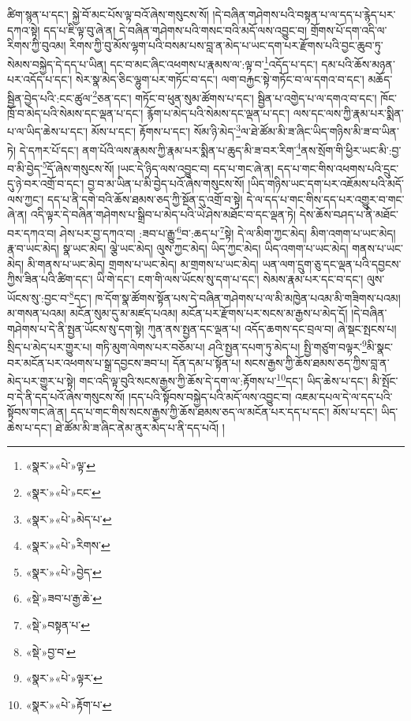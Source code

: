 ཚིག་སྙན་པ་དང་། སྐྱེ་བོ་མང་པོས་ལྟ་བའོ་ཞེས་གསུངས་སོ། །དེ་བཞིན་གཤེགས་པའི་བསྟན་པ་ལ་དད་པ་རྙེད་པར་དཀའ་སྟེ། དད་པ་ཇི་ལྟ་བུ་ཞེ་ན། དེ་བཞིན་གཤེགས་པའི་གསང་བའི་མདོ་ལས་འབྱུང་བ། གྲོགས་པོ་དག་འདི་ལ་རིགས་ཀྱི་བུའམ། རིགས་ཀྱི་བུ་མོས་ལྷག་པའི་བསམ་པས་བླ་ན་མེད་པ་ཡང་དག་པར་རྫོགས་པའི་བྱང་ཆུབ་ཏུ་སེམས་བསྐྱེད་དེ་དད་པ་ཡིན། དང་བ་མང་ཞིང་འཕགས་པ་རྣམས་ལ་:ལྟ་བ་\footnote{«སྣར་»«པེ་»ལྟ་}འདོད་པ་དང་། དམ་པའི་ཆོས་མཉན་པར་འདོད་པ་དང་། སེར་སྣ་མེད་ཅིང་ལྷུག་པར་གཏོང་བ་དང་། ལག་བརྐྱང་སྟེ་གཏོང་བ་ལ་དགའ་བ་དང་། མཆོད་སྦྱིན་བྱེད་པའི་:ངང་ཚུལ་\footnote{«སྣར་»«པེ་»ངང་}ཅན་དང་། གཏོང་བ་ཕུན་སུམ་ཚོགས་པ་དང་། སྦྱིན་པ་འགྱེད་པ་ལ་དགའ་བ་དང་། ཁོང་ཁྲོ་བ་མེད་པའི་སེམས་དང་ལྡན་པ་དང་། རྙོག་པ་མེད་པའི་སེམས་དང་ལྡན་པ་དང་། ལས་དང་ལས་ཀྱི་རྣམ་པར་སྨིན་པ་ལ་ཡིད་ཆེས་པ་དང་། མོས་པ་དང་། རྟོགས་པ་དང་། སོམ་ཉི་མེད་\footnote{«སྣར་»«པེ་»མེད་པ་}ལ་ཐེ་ཚོམ་མི་ཟ་ཞིང་ཡིད་གཉིས་མི་ཟ་བ་ཡིན་ཏེ། དེ་དཀར་པོ་དང་། ནག་པོའི་ལས་རྣམས་ཀྱི་རྣམ་པར་སྨིན་པ་ཆུད་མི་ཟ་བར་རིག་\footnote{«སྣར་»«པེ་»རིགས་}ནས་སྲོག་གི་ཕྱིར་ཡང་མི་:བྱ་བ་མི་བྱེད་\footnote{«སྣར་»«པེ་»བྱེད་}དོ་ཞེས་གསུངས་སོ། །ཡང་དེ་ཉིད་ལས་འབྱུང་བ། དད་པ་གང་ཞེ་ན། དད་པ་གང་གིས་འཕགས་པའི་དྲུང་དུ་ཉེ་བར་འགྲོ་བ་དང་། བྱ་བ་མ་ཡིན་པ་མི་བྱེད་པའོ་ཞེས་གསུངས་སོ། །ཡིད་གཉིས་ཡང་དག་པར་འཇོམས་པའི་མདོ་ལས་ཀྱང་། དད་པ་ནི་དགེ་བའི་ཆོས་ཐམས་ཅད་ཀྱི་སྔོན་དུ་འགྲོ་བ་སྟེ། དེ་ལ་དད་པ་གང་གིས་དད་པར་འགྱུར་བ་གང་ཞེ་ན། འདི་ལྟར་དེ་བཞིན་གཤེགས་པ་སྒྲིབ་པ་མེད་པའི་ཡེ་ཤེས་མཐོང་བ་དང་ལྡན་ཏེ། དེས་ཆོས་བཤད་པ་ནི་མཐོང་བར་དཀའ་བ། ཤེས་པར་བྱ་དཀའ་བ། :ཟབ་པ་རྒྱུ་\footnote{«སྡེ་»ཟབ་པ་རྒྱ་ཆེ་}བ་:ཆད་པ་\footnote{«སྡེ་»བསྟན་པ་}སྟེ། དེ་ལ་མིག་ཀྱང་མེད། མིག་འགག་པ་ཡང་མེད། རྣ་བ་ཡང་མེད། སྣ་ཡང་མེད། ལྕེ་ཡང་མེད། ལུས་ཀྱང་མེད། ཡིད་ཀྱང་མེད། ཡིད་འགག་པ་ཡང་མེད། གནས་པ་ཡང་མེད། མི་གནས་པ་ཡང་མེད། གྲགས་པ་ཡང་མེད། མ་གྲགས་པ་ཡང་མེད། ཡན་ལག་དྲུག་ཅུ་དང་ལྡན་པའི་དབྱངས་ཀྱིས་ཟིན་པའི་ཚིག་དང་། ཡི་གེ་དང་། ངག་གི་ལས་ཡོངས་སུ་དག་པ་དང་། སེམས་རྣམ་པར་དང་བ་དང་། ལུས་ཡོངས་སུ་:བྱང་བ་\footnote{«སྡེ་»བྱ་བ་}དང་། ཁ་དོག་སྣ་ཚོགས་སྟོན་པས་དེ་བཞིན་གཤེགས་པ་ལ་མི་མཁྱེན་པའམ་མི་གཟིགས་པའམ། མ་གསན་པའམ། མངོན་སུམ་དུ་མ་མཛད་པའམ། མངོན་པར་རྫོགས་པར་སངས་མ་རྒྱས་པ་མེད་དོ། །དེ་བཞིན་གཤེགས་པ་དེ་ནི་སྤྱན་ཡོངས་སུ་དག་སྟེ། ཀུན་ནས་སྤྱན་དང་ལྡན་པ། འདོད་ཆགས་དང་བྲལ་བ། ཞེ་སྡང་སྤངས་པ། སྲིད་པ་མེད་པར་གྱུར་པ། གཏི་མུག་ལེགས་པར་བཅོམ་པ། ཤའི་སྤྱན་དཔག་ཏུ་མེད་པ། སྤྱི་གཙུག་བལྟར་\footnote{«སྣར་»«པེ་»ལྟར་}མི་སྣང་བར་མངོན་པར་འཕགས་པ་སྒྲ་དབྱངས་ཟབ་པ། དོན་དམ་པ་སྟོན་པ། སངས་རྒྱས་ཀྱི་ཆོས་ཐམས་ཅད་ཀྱིས་བླ་ན་མེད་པར་གྱུར་པ་སྟེ། གང་འདི་ལྟ་བུའི་སངས་རྒྱས་ཀྱི་ཆོས་དེ་དག་ལ་:རྟོགས་པ་\footnote{«སྣར་»«པེ་»རྟོག་པ་}དང་། ཡིད་ཆེས་པ་དང་། མི་སྤོང་བ་དེ་ནི་དད་པའོ་ཞེས་གསུངས་སོ། །དད་པའི་སྟོབས་བསྐྱེད་པའི་མདོ་ལས་འབྱུང་བ། འཇམ་དཔལ་དེ་ལ་དད་པའི་སྟོབས་གང་ཞེ་ན། དད་པ་གང་གིས་སངས་རྒྱས་ཀྱི་ཆོས་ཐམས་ཅད་ལ་མངོན་པར་དད་པ་དང་། མོས་པ་དང་། ཡིད་ཆེས་པ་དང་། ཐེ་ཚོམ་མི་ཟ་ཞིང་ནེམ་ནུར་མེད་པ་ནི་དད་པའོ། །

